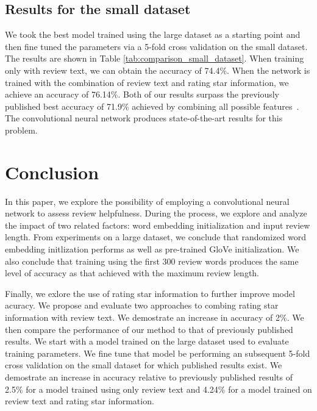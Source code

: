 \documentclass[conference,compsoc]{IEEEtran}
\begin{document}
\subsection{Results for the small dataset}%
We took the best model trained using the large dataset as a starting point and then fine tuned the parameters via a 5-fold cross validation on the small dataset. The results are shown in Table \ref{tab:comparison_small_dataset}. When training only with review text, we can obtain the accuracy of 74.4\%. When the network is trained with the combination of review text and rating star information, we achieve an accuracy of 76.14\%. Both of our results surpass the previously published best accuracy of 71.9\% achieved by combining all possible features~\cite{Hong_2012}. The convolutional neural network produces state-of-the-art results for this problem.


\section{Conclusion}\label{sec:conclusion}
In this paper, we explore the possibility of employing a convolutional neural network to assess review helpfulness. During the process, we explore and analyze the impact of two related factors: word embedding initialization and input review length. From experiments on a large dataset, we conclude that randomized word embedding initlization performs as well as pre-trained GloVe initialization. We also conclude that training using the first 300 review words produces the same level of accuracy as that achieved with the maximum review length.

Finally, we exlore the use of rating star information to further improve model acuracy. We propose and evaluate two approaches to combing rating star information with review text. We demostrate an increase in accuracy of 2\%. We then compare the performance of our method to that of previously published results. We start with a model trained on the large dataset used to evaluate training parameters. We fine tune that model be performing an subsequent 5-fold cross validation on the small dataset for which published results exist. We demostrate an increase in accuracy relative to previously published results of 2.5\% for a model trained using only review text and 4.24\% for a model trained on review text and rating star information.






\end{document}
